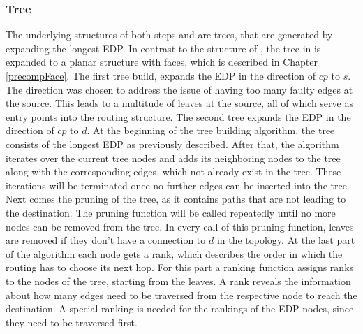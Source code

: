 \documentclass[a4paper,UKenglish,cleveref, autoref, thm-restate,dvipsnames]{lipics-v2021}
\begin{document}
\subsubsection{Tree}
\label{precompTree}
The underlying structures of both steps  and  are trees, that are generated by expanding the longest EDP.
In contrast to the structure of , the tree in  is expanded to a planar structure with faces, which is described in Chapter \ref{precompFace}. 
The first tree build, expands the EDP in the direction of $cp$ to $s$.
The direction was chosen to address the issue of having too many faulty edges at the source. This leads to a multitude of leaves at the source, all of which serve as entry points into the routing structure.
The second tree expands the EDP in the direction of $cp$ to $d$.
At the beginning of the tree building algorithm, the tree consists of the longest EDP as previously described.
After that, the algorithm iterates over the current tree nodes and adds its neighboring nodes to the tree along with the corresponding edges, which not already exist in the tree.
These iterations will be terminated once no further edges can be inserted into the tree.
Next comes the pruning of the tree, as it contains paths that are not leading to the destination. The pruning function will be called repeatedly until no more nodes can be removed from the tree.
In every call of this pruning function, leaves are removed if they don't have a connection to $d$ in the topology.
At the last part of the algorithm each node gets a rank, which describes the order in which the routing has to choose its next hop.
For this part a ranking function assigns ranks to the nodes of the tree, starting from the leaves.
A rank reveals the information about how many edges need to be traversed from the respective node to reach the destination.
A special ranking is needed for the rankings of the EDP nodes, since they need to be traversed first.
\end{document}

